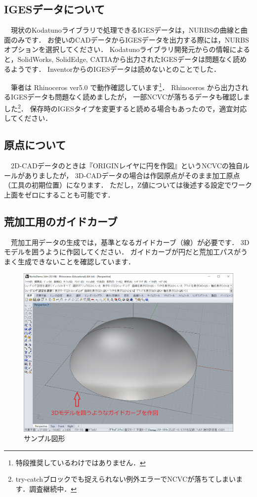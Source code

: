 
\subsection{IGESデータについて}
\label{sec:AboutIGES}
　現状のKodatunoライブラリで処理できるIGESデータは，NURBSの曲線と曲面のみです．
お使いのCADデータからIGESデータを出力する際には，NURBSオプションを選択してください．
Kodatunoライブラリ開発元からの情報によると，SolidWorks, SolidEdge, CATIAから出力されたIGESデータは問題なく読めるようです．
InventorからのIGESデータは読めないとのことでした．

　筆者は Rhinoceros ver5.0 で動作確認しています\footnote{特段推奨しているわけではありません．}．
Rhinoceros から出力されるIGESデータも問題なく読めましたが，
一部NCVCが落ちるデータも確認しました\footnote{try-catchブロックでも捉えられない例外エラーでNCVCが落ちてしまいます．調査継続中．}．
保存時のIGESタイプを変更すると読める場合もあったので，適宜対応してください．

\subsection{原点について}
　2D-CADデータのときは『ORIGINレイヤに円を作図』というNCVCの独自ルールがありましたが，
3D-CADデータの場合は作図原点がそのまま加工原点（工具の初期位置）になります．
ただし，Z値については後述する設定でワーク上面をゼロにすることも可能です．

\subsection{荒加工用のガイドカーブ}
　荒加工用データの生成では，基準となるガイドカーブ（線）が必要です．
3Dモデルを囲うように作図してください．
ガイドカーブが円だと荒加工パスがうまく生成できないことを確認しています．

\begin{figure}[H]
\centering
\includegraphics[scale=0.5]{No1/fig/fig11.png}
\caption{サンプル図形}
\label{fig:sample.iges}
\end{figure}

